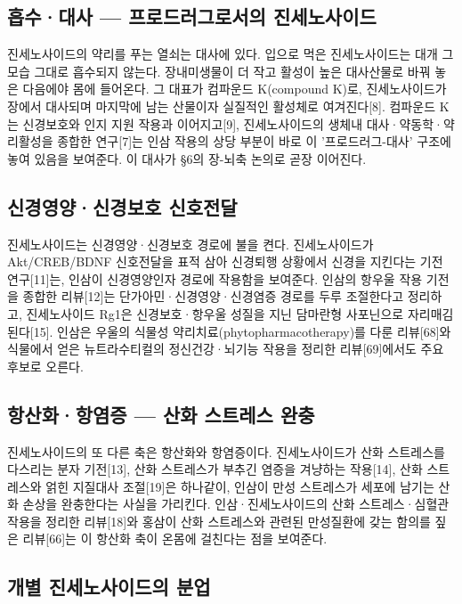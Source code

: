 \documentclass[12pt,oneside]{book}
\begin{document}
\subsection{흡수·대사 — 프로드러그로서의 진세노사이드}

진세노사이드의 약리를 푸는 열쇠는 대사에 있다. 입으로 먹은 진세노사이드는 대개 그 모습 그대로 흡수되지 않는다. 장내미생물이 더 작고 활성이 높은 대사산물로 바꿔 놓은 다음에야 몸에 들어온다. 그 대표가 컴파운드 K(compound K)로, 진세노사이드가 장에서 대사되며 마지막에 남는 산물이자 실질적인 활성체로 여겨진다[8]. 컴파운드 K는 신경보호와 인지 지원 작용과 이어지고[9], 진세노사이드의 생체내 대사·약동학·약리활성을 종합한 연구[7]는 인삼 작용의 상당 부분이 바로 이 '프로드러그-대사' 구조에 놓여 있음을 보여준다. 이 대사가 §6의 장-뇌축 논의로 곧장 이어진다.

\subsection{신경영양·신경보호 신호전달}

진세노사이드는 신경영양·신경보호 경로에 불을 켠다. 진세노사이드가 Akt/CREB/BDNF 신호전달을 표적 삼아 신경퇴행 상황에서 신경을 지킨다는 기전 연구[11]는, 인삼이 신경영양인자 경로에 작용함을 보여준다. 인삼의 항우울 작용 기전을 종합한 리뷰[12]는 단가아민·신경영양·신경염증 경로를 두루 조절한다고 정리하고, 진세노사이드 Rg1은 신경보호·항우울 성질을 지닌 담마란형 사포닌으로 자리매김된다[15]. 인삼은 우울의 식물성 약리치료(phytopharmacotherapy)를 다룬 리뷰[68]와 식물에서 얻은 뉴트라수티컬의 정신건강·뇌기능 작용을 정리한 리뷰[69]에서도 주요 후보로 오른다.

\subsection{항산화·항염증 — 산화 스트레스 완충}

진세노사이드의 또 다른 축은 항산화와 항염증이다. 진세노사이드가 산화 스트레스를 다스리는 분자 기전[13], 산화 스트레스가 부추긴 염증을 겨냥하는 작용[14], 산화 스트레스와 얽힌 지질대사 조절[19]은 하나같이, 인삼이 만성 스트레스가 세포에 남기는 산화 손상을 완충한다는 사실을 가리킨다. 인삼·진세노사이드의 산화 스트레스·심혈관 작용을 정리한 리뷰[18]와 홍삼이 산화 스트레스와 관련된 만성질환에 갖는 함의를 짚은 리뷰[66]는 이 항산화 축이 온몸에 걸친다는 점을 보여준다.

\subsection{개별 진세노사이드의 분업}
\end{document}
